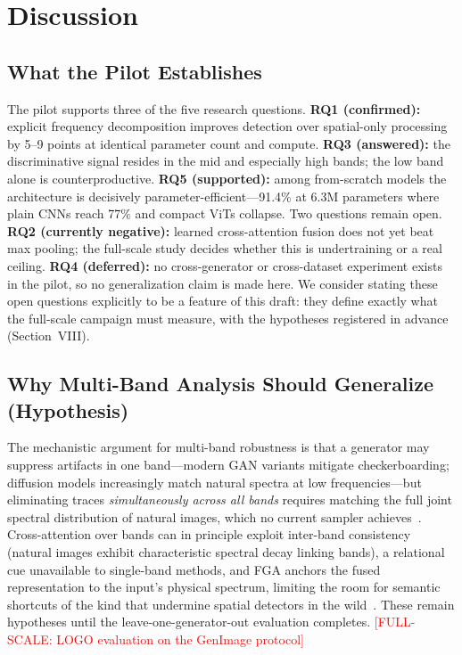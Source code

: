 \documentclass[journal]{IEEEtran}
\newcommand{\fullscale}[1]{\textcolor{red}{[FULL-SCALE: #1]}}
\begin{document}
\section{Discussion}

\subsection{What the Pilot Establishes}
The pilot supports three of the five research questions. \textbf{RQ1 (confirmed):} explicit frequency decomposition improves detection over spatial-only processing by 5--9 points at identical parameter count and compute. \textbf{RQ3 (answered):} the discriminative signal resides in the mid and especially high bands; the low band alone is counterproductive. \textbf{RQ5 (supported):} among from-scratch models the architecture is decisively parameter-efficient---91.4\% at 6.3M parameters where plain CNNs reach 77\% and compact ViTs collapse. Two questions remain open. \textbf{RQ2 (currently negative):} learned cross-attention fusion does not yet beat max pooling; the full-scale study decides whether this is undertraining or a real ceiling. \textbf{RQ4 (deferred):} no cross-generator or cross-dataset experiment exists in the pilot, so no generalization claim is made here. We consider stating these open questions explicitly to be a feature of this draft: they define exactly what the full-scale campaign must measure, with the hypotheses registered in advance (Section~VIII).

\subsection{Why Multi-Band Analysis Should Generalize (Hypothesis)}
The mechanistic argument for multi-band robustness is that a generator may suppress artifacts in one band---modern GAN variants mitigate checkerboarding; diffusion models increasingly match natural spectra at low frequencies---but eliminating traces \emph{simultaneously across all bands} requires matching the full joint spectral distribution of natural images, which no current sampler achieves~\cite{corvi2023,ricker2024}. Cross-attention over bands can in principle exploit inter-band consistency (natural images exhibit characteristic spectral decay linking bands), a relational cue unavailable to single-band methods, and FGA anchors the fused representation to the input's physical spectrum, limiting the room for semantic shortcuts of the kind that undermine spatial detectors in the wild~\cite{yan2025sanity}. These remain hypotheses until the leave-one-generator-out evaluation completes. \fullscale{LOGO evaluation on the GenImage protocol}
\end{document}
